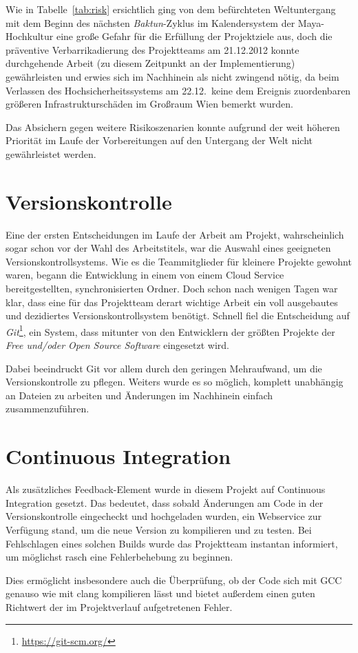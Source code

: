 Wie in Tabelle~\ref{tab:risk} ersichtlich ging von dem befürchteten Weltuntergang mit dem Beginn des nächsten \textit{Baktun}-Zyklus im Kalendersystem der Maya-Hochkultur eine große Gefahr für die Erfüllung der Projektziele aus, doch die präventive Verbarrikadierung des Projektteams am 21.12.2012 konnte  durchgehende Arbeit (zu diesem Zeitpunkt an der Implementierung) gewährleisten und erwies sich im Nachhinein als nicht zwingend nötig, da beim Verlassen des Hochsicherheitssystems am 22.12.\ keine dem Ereignis zuordenbaren größeren Infrastrukturschäden im Großraum Wien bemerkt wurden.

Das Absichern gegen weitere Risikoszenarien konnte aufgrund der weit höheren Priorität im Laufe der Vorbereitungen auf den Untergang der Welt nicht gewährleistet werden.

\section{Versionskontrolle}
Eine der ersten Entscheidungen im Laufe der Arbeit am Projekt, wahrscheinlich sogar schon vor der Wahl des Arbeitstitels, war die Auswahl eines geeigneten Versionskontrollsystems. Wie es die Teammitglieder für kleinere Projekte gewohnt waren, begann die Entwicklung in einem von einem Cloud Service bereitgestellten, synchronisierten Ordner. Doch schon nach wenigen Tagen war klar, dass eine für das Projektteam derart wichtige Arbeit ein voll ausgebautes und dezidiertes Versionskontrollsystem benötigt. Schnell fiel die Entscheidung auf \textit{Git}\footnote{\url{https://git-scm.org/}}, ein System, dass mitunter von den Entwicklern der größten Projekte der \textit{Free und/oder Open Source Software} eingesetzt wird.

Dabei beeindruckt Git vor allem durch den geringen Mehraufwand, um die Versionskontrolle zu pflegen. Weiters wurde es so möglich, komplett unabhängig an Dateien zu arbeiten und Änderungen im Nachhinein einfach zusammenzuführen.

\section{Continuous Integration}
Als zusätzliches Feedback-Element wurde in diesem Projekt auf Continuous Integration ge\-setzt. Das bedeutet, dass sobald Änderungen am Code in der Versionskontrolle eingecheckt und hochgeladen wurden, ein Webservice zur Verfügung stand, um die neue Version zu kompilieren und zu testen. Bei Fehlschlagen eines solchen Builds wurde das Projektteam instantan informiert, um möglichst rasch eine Fehlerbehebung zu beginnen.

Dies ermöglicht insbesondere auch die Überprüfung, ob der Code sich mit GCC genauso wie mit clang kompilieren lässt und bietet außerdem einen guten Richtwert der im Projektverlauf aufgetretenen Fehler. 
